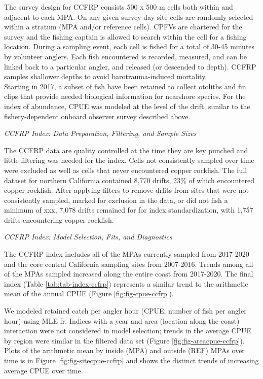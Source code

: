 \documentclass[11pt,
  english,
  letterpaper,
]{article}
\begin{document}
The survey design for CCFRP consists 500 x 500 m cells both within and adjacent to each MPA. On any given survey day site cells are randomly selected within a stratum (MPA and/or reference cells). CPFVs are chartered for the survey and the fishing captain is allowed to search within the cell for a fishing location. During a sampling event, each cell is fished for a total of 30-45 minutes by volunteer anglers. Each fish encountered is recorded, measured, and can be linked back to a particular angler, and released (or descended to depth). CCFRP samples shallower depths to avoid barotrauma-induced mortality.\\
Starting in 2017, a subset of fish have been retained to collect otoliths and fin clips that provide needed biological information for nearshore species. For the index of abundance, CPUE was modeled at the level of the drift, similar to the fishery-dependent onboard observer survey described above.

\emph{CCFRP Index: Data Preparation, Filtering, and Sample Sizes}

The CCFRP data are quality controlled at the time they are key punched and little filtering was needed for the index. Cells not consistently sampled over time were excluded as well as cells that never encountered copper rockfish. The full dataset for northern California contained 8,770 drifts, 23\% of which encountered copper rockfish. After applying filters to remove drfits from sites that were not consistently sampled, marked for exclusion in the data, or did not fish a minimum of xxx, 7,078 drifts remained for for index standardization, with 1,757 drifts encountering copper rockfish.

\emph{CCFRP Index: Model Selection, Fits, and Diagnostics}

The CCFRP index includes all of the MPAs currently sampled from 2017-2020 and the core central California sampling sites from 2007-2016. Trends among all of the MPAs sampled increased along the entire coast from 2017-2020. The final index (Table \ref{tab:tab-index-ccfrp}) represents a similar trend to the arithmetic mean of the annual CPUE (Figure \ref{fig:fig-cpue-ccfrp}).

We modeled retained catch per angler hour (CPUE; number of fish per angler hour) using MLE fr. Indices with a year and area (location along the coast) interaction were not considered in model selection; trends in the average CPUE by region were similar in the filtered data set (Figure \ref{fig:fig-areacpue-ccfrp}). Plots of the arithmetic mean by inside (MPA) and outside (REF) MPAs over time is in Figure \ref{fig:fig-sitecpue-ccfrp} and shows the distinct trends of increasing average CPUE over time.
\end{document}
